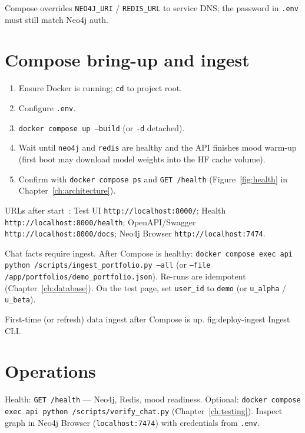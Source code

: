 \noindent
Compose overrides \texttt{NEO4J\_URI} / \texttt{REDIS\_URL} to service DNS; the password in \texttt{.env} must still match Neo4j auth.

\section{Compose bring-up and ingest}

\begin{enumerate}[leftmargin=*]
  \item Ensure Docker is running; \texttt{cd} to project root.
  \item Configure \texttt{.env}.
  \item \texttt{docker compose up --build} (or \texttt{-d} detached).
  \item Wait until \texttt{neo4j} and \texttt{redis} are healthy and the API finishes mood warm-up (first boot may download model weights into the HF cache volume).
  \item Confirm with \texttt{docker compose ps} and \texttt{GET /health} (Figure~\ref{fig:health} in Chapter~\ref{ch:architecture}).
\end{enumerate}

\noindent
URLs after start~\cite{readme}: Test UI \texttt{http://localhost:8000/}; Health \texttt{http://localhost:8000/health}; OpenAPI/Swagger \texttt{http://localhost:8000/docs}; Neo4j Browser \texttt{http://localhost:7474}.

Chat facts require ingest. After Compose is healthy: \texttt{docker compose exec api python /scripts/ingest\_portfolio.py --all} (or \texttt{--file /app/portfolios/demo\_portfolio.json}). Re-runs are idempotent (Chapter~\ref{ch:database}). On the test page, set \texttt{user\_id} to \texttt{demo} (or \texttt{u\_alpha} / \texttt{u\_beta}).

%
{First-time (or refresh) data ingest after Compose is up.}%
{fig:deploy-ingest}%
{Ingest CLI.}

\section{Operations}

Health: \texttt{GET /health} --- Neo4j, Redis, mood readiness. Optional: \texttt{docker compose exec api python /scripts/verify\_chat.py} (Chapter~\ref{ch:testing}). Inspect graph in Neo4j Browser (\texttt{localhost:7474}) with credentials from \texttt{.env}.

